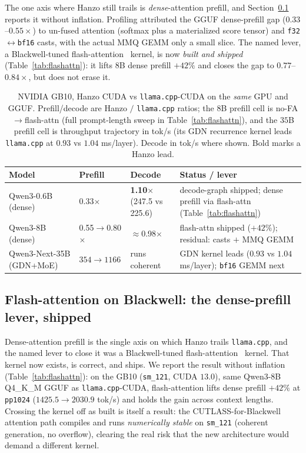 \documentclass[11pt]{article}
\begin{document}
The one axis where Hanzo still trails is \emph{dense}-attention prefill, and Section~\ref{sec:flashattn}
reports it without inflation. Profiling attributed the GGUF dense-prefill gap ($0.33$--$0.55\times$) to
un-fused attention (softmax plus a materialized score tensor) and \texttt{f32}$\leftrightarrow$\texttt{bf16}
casts, with the actual MMQ GEMM only a small slice. The named lever, a Blackwell-tuned
flash-attention~\cite{dao2022} kernel, is now \emph{built and shipped} (Table~\ref{tab:flashattn}): it
lifts $8$B dense prefill $+42\%$ and closes the gap to $0.77$--$0.84\times$, but does not erase it.

\begin{table}[t]
\centering
\caption{NVIDIA GB10, Hanzo CUDA vs \texttt{llama.cpp}-CUDA on the \emph{same} GPU and GGUF.
Prefill/decode are Hanzo $/$ \texttt{llama.cpp} ratios; the $8$B prefill cell is no-FA$\to$flash-attn
(full prompt-length sweep in Table~\ref{tab:flashattn}), and the $35$B prefill cell is throughput
trajectory in tok/s (its GDN recurrence kernel leads \texttt{llama.cpp} at $0.93$ vs $1.04$ ms/layer).
Decode in tok/s where shown. Bold marks a Hanzo lead.}
\label{tab:cuda}
\begin{tabular}{l ll l}
\toprule
\textbf{Model} & \textbf{Prefill} & \textbf{Decode} & \textbf{Status / lever} \\
\midrule
Qwen3-0.6B (dense) & 0.33$\times$ & \textbf{1.10$\times$} (247.5 vs 225.6) & decode-graph shipped; dense prefill via flash-attn (Table~\ref{tab:flashattn}) \\
Qwen3-8B (dense)   & 0.55$\to$0.80$\times$ & $\approx$0.98$\times$ & flash-attn shipped ($+42\%$); residual: casts $+$ MMQ GEMM \\
Qwen3-Next-35B (GDN+MoE) & $354\to1166$ & runs coherent & GDN kernel leads ($0.93$ vs $1.04$ ms/layer); \texttt{bf16} GEMM next \\
\bottomrule
\end{tabular}
\end{table}

\subsection{Flash-attention on Blackwell: the dense-prefill lever, shipped}
\label{sec:flashattn}

Dense-attention prefill is the single axis on which Hanzo trails \texttt{llama.cpp}, and the named lever
to close it was a Blackwell-tuned flash-attention~\cite{dao2022} kernel. That kernel now exists, is
correct, and ships. We report the result without inflation (Table~\ref{tab:flashattn}): on the GB10
(\texttt{sm\_121}, CUDA $13.0$), same Qwen3-8B Q4\_K\_M GGUF as \texttt{llama.cpp}-CUDA, flash-attention
lifts dense prefill \textbf{$+42\%$} at \texttt{pp1024} ($1425.5 \to 2030.9$ tok/s) and holds the gain
across context lengths. Crossing the kernel off as built is itself a result: the CUTLASS-for-Blackwell
attention path compiles and runs \emph{numerically stable} on \texttt{sm\_121} (coherent generation, no
overflow), clearing the real risk that the new architecture would demand a different kernel.
\end{document}
